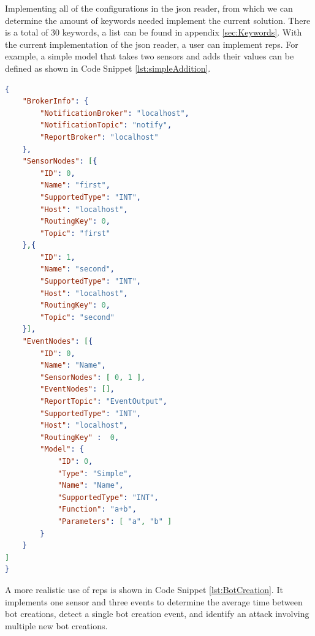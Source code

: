 		Implementing all of the configurations in the \gls{json} reader, from which we can determine the amount of keywords needed implement the current solution. There is a total of 30 keywords, a list can be found in appendix \ref{sec:Keywords}.
		\newpage
		With the current implementation of the \gls{json} reader, a user can implement \gls{reps}. For example, a simple model that takes two sensors and adds their values can be defined as shown in Code Snippet \ref{lst:simpleAddition}.
{\scriptsize\begin{lstlisting}[language=json, caption={A simple model for addition}, label=lst:simpleAddition]
{
	"BrokerInfo": {
		"NotificationBroker": "localhost",
		"NotificationTopic": "notify",
		"ReportBroker": "localhost"
	},
	"SensorNodes": [{
		"ID": 0,
		"Name": "first",
		"SupportedType": "INT",
		"Host": "localhost",
		"RoutingKey": 0,
		"Topic": "first"
	},{
		"ID": 1,
		"Name": "second",
		"SupportedType": "INT",
		"Host": "localhost",
		"RoutingKey": 0,
		"Topic": "second"
	}],
	"EventNodes": [{
		"ID": 0,
		"Name": "Name",
		"SensorNodes": [ 0, 1 ],
		"EventNodes": [],
		"ReportTopic": "EventOutput",
		"SupportedType": "INT",
		"Host": "localhost",
		"RoutingKey" :  0,
		"Model": {
			"ID": 0,
			"Type": "Simple",
			"Name": "Name",
			"SupportedType": "INT",
			"Function": "a+b",
			"Parameters": [ "a", "b" ]
		}
	}
]
}\end{lstlisting}}
		A more realistic use of \gls{reps} is shown in Code Snippet \ref{lst:BotCreation}. It implements one sensor and three events to determine the average time between bot creations, detect a single bot creation event, and identify an attack involving multiple new bot creations.
		
